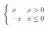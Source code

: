 \documentclass[preview,border=6pt]{standalone}
\begin{document}
\fontsize{36.000000}{43.200000}\selectfont
$\displaystyle \begin{cases} x & x > 0 \\ -x & x \leq 0 \end{cases}$
\end{document}

